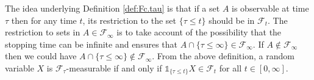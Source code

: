 \documentclass[12pt]{book}
\numberwithin{equation}{chapter}
\theoremstyle{plain}
\numberwithin{theorem}{section}
\theoremstyle{definition}
\newtheorem{definition}[theorem]{\underline{Definition}}
\newtheorem{example}[theorem]{\underline{Example}}
\numberwithin{exercise}{chapter}
\newcommand{\<}{\langle}
\renewcommand{\>}{\rangle}
\renewcommand{\(}{\left(}
\renewcommand{\)}{\right)}
\renewcommand{\[}{\left[}
\renewcommand{\]}{\right]}
\newcommand\Eb{\mathds{E}}
\newcommand\Fb{\mathds{F}}
\newcommand\Ib{\mathds{1}} 	%
\newcommand\Pb{\mathds{P}}
\newcommand\Rb{\mathds{R}}
\newcommand\Ec{\mathscr{E}}
\newcommand\Fc{\mathscr{F}}
\newcommand\Om{\Omega}
\newcommand\sig{\sigma}
\newcommand\lam{\lambda}
\newcommand\dd{\mathrm{d}}
\begin{document}
\noindent
The idea underlying Definition \eqref{def:Fc.tau} is that if a set $A$ is observable at time $\tau$ then for any time $t$, its restriction to the set $\{\tau\leq t\}$ should be in $\Fc_t$.  The restriction to sets in $A \in \Fc_\infty$ is to take account of the possibility that the stopping time can be infinite and ensures that $A \cap \{ \tau \leq \infty \} \in \Fc_\infty$. 
If $A \notin \Fc_\infty$ then we could have $A \cap \{ \tau \leq \infty \} \notin \Fc_\infty$.
From the above definition, a random variable $X$ is $\Fc_\tau$-measurable if and only if 
$\Ib_{\{\tau \leq t\}} X \in \Fc_t$ for all $t \in [0,\infty]$.
%
%
%
\end{document}
